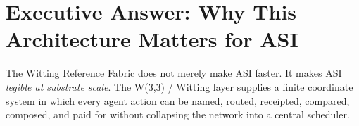 \documentclass[11pt,letterpaper]{article}
\theoremstyle{remark}
\begin{document}
\section{Executive Answer: Why This Architecture Matters for ASI}\label{sec:asi}

\begin{bluf}
The Witting Reference Fabric does not merely make ASI faster. It makes ASI
\emph{legible at substrate scale}. The W(3,3) / Witting layer supplies a finite coordinate
system in which every agent action can be named, routed, receipted, compared, composed,
and paid for without collapsing the network into a central scheduler.
\end{bluf}
\end{document}
